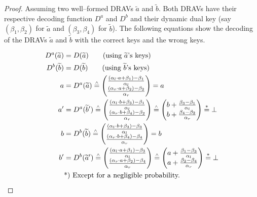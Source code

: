 \begin{proof}

  Assuming two well--formed DRAVs $\widetilde{a}$ and $\widetilde{b}$. Both
  DRAVs have their respective decoding function $D^a$ and $D^b$ and their
  dynamic dual key (say $(\beta_1, \beta_2)$ for $\widetilde{a}$ and
  $(\beta_3, \beta_4)$ for $\widetilde{b}$). The following equations show
  the decoding of the DRAVs $\widetilde{a}$ and $\widetilde{b}$ with the correct
  keys and the wrong keys.

  \begin{align*}
    D^a(\widetilde{a}) &= D(\widetilde{a}) \qquad\text{(using $\widetilde{a}$'s
    keys)}\\
    D^b(\widetilde{b}) &= D(\widetilde{b}) \qquad\text{(using $\widetilde{b}$'s
    keys)}\\
    a &= D^a(\widetilde{a}) \stackrel{\scriptscriptstyle\wedge}{=}
    \begin{pmatrix}
      \frac{(\alpha_l \cdot a + \beta_1) - \beta_1}{\alpha_l}\\
      \frac{(\alpha_r \cdot a + \beta_2) - \beta_2}{\alpha_r}\\
    \end{pmatrix}
    = a\\
    a' &= D^a(\widetilde{b}')
    \stackrel{\scriptscriptstyle\wedge}{=}
    \begin{pmatrix}
      \frac{(\alpha_l \cdot b + \beta_3) - \beta_1}{\alpha_l}\\
      \frac{(\alpha_r \cdot b + \beta_4) - \beta_2}{\alpha_r}\\
    \end{pmatrix}
    \stackrel{\scriptscriptstyle\wedge}{=}
    \begin{pmatrix}
      b +
      \frac{\beta_3 - \beta_1}{\alpha_l}\\
      b +
      \frac{\beta_4 - \beta_2}{\alpha_r}\\
    \end{pmatrix}
    \stackrel{*}{=} \bot\\
    b &= D^b(\widetilde{b}) \stackrel{\scriptscriptstyle\wedge}{=}
    \begin{pmatrix}
      \frac{(\alpha_l \cdot b + \beta_3) - \beta_3}{\alpha_l}\\
      \frac{(\alpha_r \cdot b + \beta_4) - \beta_4}{\alpha_r}\\
    \end{pmatrix}
    = b\\
    b' &= D^b(\widetilde{a}')
    \stackrel{\scriptscriptstyle\wedge}{=}
    \begin{pmatrix}
      \frac{(\alpha_l \cdot a + \beta_1) - \beta_3}{\alpha_l}\\
      \frac{(\alpha_r \cdot a + \beta_2) - \beta_4}{\alpha_r}\\
    \end{pmatrix}
    \stackrel{\scriptscriptstyle\wedge}{=}
    \begin{pmatrix}
      a +
      \frac{\beta_1 - \beta_3}{\alpha_l}\\
      a +
      \frac{\beta_2 - \beta_4}{\alpha_r}\\
    \end{pmatrix}
    \stackrel{*}{=} \bot\\
    &\text{*) Except for a negligible probability.}{}
  \end{align*}


\end{proof}
